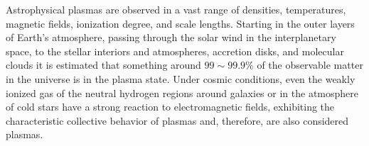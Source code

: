 \documentclass[12pt,a4paper,ruledheader]{report}
\begin{document}
\begin{appendix}



Astrophysical plasmas are observed in a vast range of densities, temperatures,
magnetic fields, ionization degree, and scale lengths\cite{peratt2014}. Starting
in the outer layers of Earth's atmosphere, passing through the solar wind in the
interplanetary space, to the stellar interiors and atmospheres, accretion disks,
and molecular clouds it is estimated that something around $99 \sim 99.9\%$ of the
observable matter in the universe is in the plasma state. Under cosmic conditions,
even the weakly ionized gas of the neutral hydrogen regions around galaxies or in
the atmosphere of cold stars have a strong reaction to electromagnetic fields,
exhibiting the characteristic collective behavior of plasmas and, therefore, are
also considered plasmas\cite{tsypa,may,peratt2014}.


\end{appendix}
\end{document}
